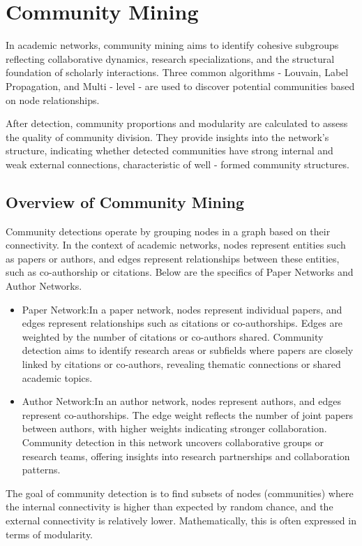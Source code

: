 \documentclass[11pt]{article}
\begin{document}
\section{Community Mining}
In academic networks, community mining aims to identify cohesive subgroups reflecting collaborative dynamics, research specializations, and the structural foundation of scholarly interactions. Three common algorithms - Louvain, Label Propagation, and Multi - level - are used to discover potential communities based on node relationships.

After detection, community proportions and modularity are calculated to assess the quality of community division. They provide insights into the network's structure, indicating whether detected communities have strong internal and weak external connections, characteristic of well - formed community structures. 

\subsection{Overview of Community Mining}
Community detections operate by grouping nodes in a graph based on their connectivity. In the context of academic networks, nodes represent entities such as papers or authors, and edges represent relationships between these entities, such as co-authorship or citations. Below are the specifics of Paper Networks and Author Networks.
\begin{itemize}
    \item {Paper Network:}In a paper network, nodes represent individual papers, and edges represent relationships such as citations or co-authorships. Edges are weighted by the number of citations or co-authors shared. Community detection aims to identify research areas or subfields where papers are closely linked by citations or co-authors, revealing thematic connections or shared academic topics.
    \item {Author Network:}In an author network, nodes represent authors, and edges represent co-authorships. The edge weight reflects the number of joint papers between authors, with higher weights indicating stronger collaboration. Community detection in this network uncovers collaborative groups or research teams, offering insights into research partnerships and collaboration patterns.
\end{itemize}

The goal of community detection is to find subsets of nodes (communities) where the internal connectivity is higher than expected by random chance, and the external connectivity is relatively lower. Mathematically, this is often expressed in terms of modularity.
\end{document}
